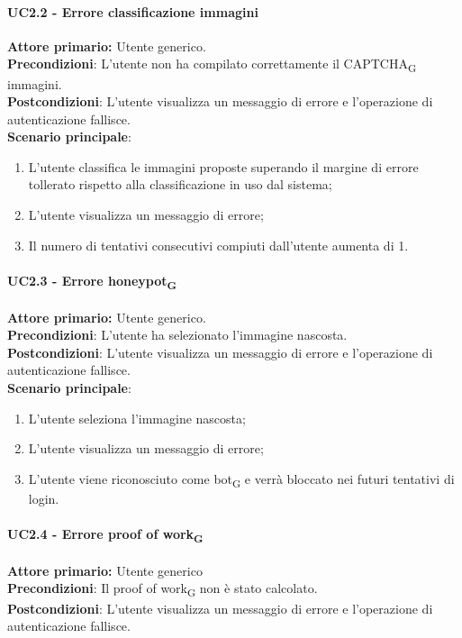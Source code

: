 \paragraph{UC2.2 - Errore classificazione immagini}
\textbf{Attore primario:} Utente generico.\\
    \textbf{Precondizioni}: L’utente non ha compilato correttamente il CAPTCHA\textsubscript{G} immagini.\\
\textbf{Postcondizioni}: L’utente visualizza un messaggio di errore e l’operazione di autenticazione fallisce.\\

\textbf{Scenario principale}:
\begin{enumerate}
    \item L'utente classifica le immagini proposte superando il margine di errore tollerato rispetto alla classificazione in uso dal sistema;
	\item L’utente visualizza un messaggio di errore;
	\item Il numero di tentativi consecutivi compiuti dall’utente aumenta di 1.
\end{enumerate}

\paragraph{UC2.3 - Errore honeypot\textsubscript{G}}
\textbf{Attore primario:} Utente generico.\\
\textbf{Precondizioni}: L’utente ha selezionato l'immagine nascosta.\\
\textbf{Postcondizioni}: L’utente visualizza un messaggio di errore e l’operazione di autenticazione fallisce.\\

\textbf{Scenario principale}:
\begin{enumerate}
    \item L'utente seleziona l'immagine nascosta;
	\item L’utente visualizza un messaggio di errore;
	\item L'utente viene riconosciuto come bot\textsubscript{G} e verrà bloccato nei futuri tentativi di login.
\end{enumerate}

\paragraph{UC2.4 - Errore proof of work\textsubscript{G}}
\textbf{Attore primario:} Utente generico\\
\textbf{Precondizioni}: Il proof of work\textsubscript{G} non è stato calcolato.\\
\textbf{Postcondizioni}:  L’utente visualizza un messaggio di errore e l’operazione di autenticazione fallisce.\\

